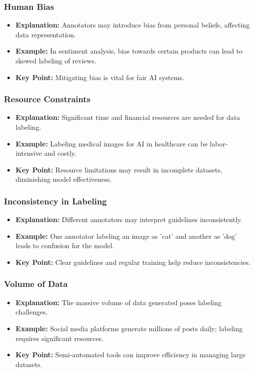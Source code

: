 \documentclass[aspectratio=169]{beamer}
\begin{document}
\begin{frame}[fragile]
    \frametitle{Human Bias}
    
    \begin{itemize}
        \item \textbf{Explanation:} Annotators may introduce bias from personal beliefs, affecting data representation.
        \item \textbf{Example:} In sentiment analysis, bias towards certain products can lead to skewed labeling of reviews.
        \item \textbf{Key Point:} Mitigating bias is vital for fair AI systems.
    \end{itemize}
\end{frame}

\begin{frame}[fragile]
    \frametitle{Resource Constraints}
    
    \begin{itemize}
        \item \textbf{Explanation:} Significant time and financial resources are needed for data labeling.
        \item \textbf{Example:} Labeling medical images for AI in healthcare can be labor-intensive and costly.
        \item \textbf{Key Point:} Resource limitations may result in incomplete datasets, diminishing model effectiveness.
    \end{itemize}
\end{frame}

\begin{frame}[fragile]
    \frametitle{Inconsistency in Labeling}
    
    \begin{itemize}
        \item \textbf{Explanation:} Different annotators may interpret guidelines inconsistently.
        \item \textbf{Example:} One annotator labeling an image as 'cat' and another as 'dog' leads to confusion for the model.
        \item \textbf{Key Point:} Clear guidelines and regular training help reduce inconsistencies.
    \end{itemize}
\end{frame}

\begin{frame}[fragile]
    \frametitle{Volume of Data}
    
    \begin{itemize}
        \item \textbf{Explanation:} The massive volume of data generated poses labeling challenges.
        \item \textbf{Example:} Social media platforms generate millions of posts daily; labeling requires significant resources.
        \item \textbf{Key Point:} Semi-automated tools can improve efficiency in managing large datasets.
    \end{itemize}
\end{frame}
\end{document}
